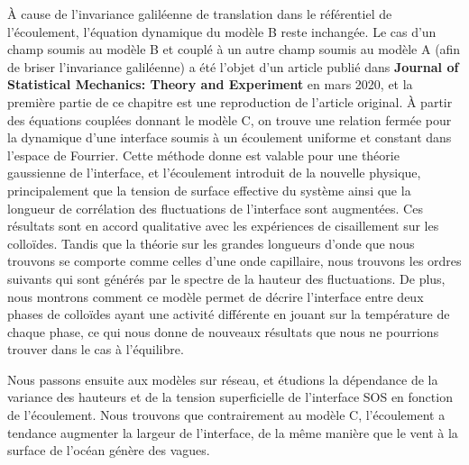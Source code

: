 À cause de l'invariance galiléenne de translation dans le référentiel de l'écoulement, l'équation dynamique du modèle B reste inchangée. Le cas d'un champ soumis au modèle B et couplé à un autre champ soumis au modèle A (afin de briser l'invariance galiléenne) a été l'objet d'un article publié dans {\bf Journal of Statistical Mechanics: Theory and Experiment} en mars 2020, et la première partie de ce chapitre est une reproduction de l'article original. À partir des équations couplées donnant le modèle C, on trouve une relation fermée pour la dynamique d'une interface soumis à un écoulement uniforme et constant dans l'espace de Fourrier. Cette méthode donne est valable pour une théorie gaussienne de l'interface, et l'écoulement introduit de la nouvelle physique, principalement que la tension de surface effective du système ainsi que la longueur de corrélation des fluctuations de l'interface sont augmentées. Ces résultats sont en accord qualitative avec les expériences de cisaillement sur les colloïdes. Tandis que la théorie sur les grandes longueurs d'onde que nous trouvons se comporte comme celles d'une onde capillaire, nous trouvons les ordres suivants qui sont générés par le spectre de la hauteur des fluctuations. De plus, nous montrons comment ce modèle permet de décrire l'interface entre deux phases de colloïdes ayant une activité différente en jouant sur la température de chaque phase, ce qui nous donne de nouveaux résultats que nous ne pourrions trouver dans le cas à l'équilibre.

Nous passons ensuite aux modèles sur réseau, et étudions la dépendance de la variance des hauteurs et de la tension superficielle de l'interface SOS en fonction de l'écoulement. Nous trouvons que contrairement au modèle C, l'écoulement a tendance augmenter la largeur de l'interface, de la même manière que le vent à la surface de l'océan génère des vagues.